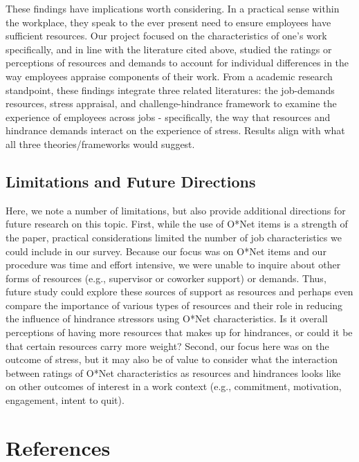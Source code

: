 \documentclass[
  man]{apa6}
\begin{document}
These findings have implications worth considering. In a practical sense within the workplace, they speak to the ever present need to ensure employees have sufficient resources. Our project focused on the characteristics of one's work specifically, and in line with the literature cited above, studied the ratings or perceptions of resources and demands to account for individual differences in the way employees appraise components of their work. From a academic research standpoint, these findings integrate three related literatures: the job-demands resources, stress appraisal, and challenge-hindrance framework to examine the experience of employees across jobs - specifically, the way that resources and hindrance demands interact on the experience of stress. Results align with what all three theories/frameworks would suggest.

\hypertarget{limitations-and-future-directions}{%
\subsection{Limitations and Future Directions}\label{limitations-and-future-directions}}

Here, we note a number of limitations, but also provide additional directions for future research on this topic. First, while the use of O*Net items is a strength of the paper, practical considerations limited the number of job characteristics we could include in our survey. Because our focus was on O*Net items and our procedure was time and effort intensive, we were unable to inquire about other forms of resources (e.g., supervisor or coworker support) or demands. Thus, future study could explore these sources of support as resources and perhaps even compare the importance of various types of resources and their role in reducing the influence of hindrance stressors using O*Net characteristics. Is it overall perceptions of having more resources that makes up for hindrances, or could it be that certain resources carry more weight? Second, our focus here was on the outcome of stress, but it may also be of value to consider what the interaction between ratings of O*Net characteristics as resources and hindrances looks like on other outcomes of interest in a work context (e.g., commitment, motivation, engagement, intent to quit).

\newpage

\hypertarget{references}{%
\section{References}\label{references}}
\end{document}
